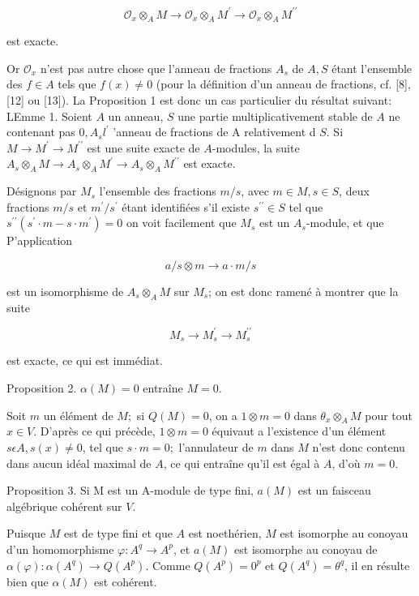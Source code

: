 $$
\mathcal{O}_{x} \otimes_{A} M \rightarrow \mathcal{O}_{x} \otimes_{A} M^{\prime} \rightarrow \mathcal{O}_{x} \otimes_{A} M^{\prime \prime}
$$

est exacte.

Or $\mathcal{O}_{x}$ n'est pas autre chose que l'anneau de fractions $A_{s}$ de $A, S$ étant l'ensemble des $f \in A$ tels que $f(x) \neq 0$ (pour la définition d'un anneau de fractions, cf. [8], [12] ou [13]). La Proposition 1 est donc un cas particulier du résultat suivant: LEmme 1. Soient $A$ un anneau, $S$ une partie multiplicativement stable de $A$ ne contenant pas $0, A_{s} l^{\prime}$ 'anneau de fractions de A relativement d $S .$ Si $M \rightarrow M^{\prime} \rightarrow M^{\prime \prime}$ est une suite exacte de $A$-modules, la suite $A_{s} \otimes_{A} M \rightarrow A_{s} \otimes_{A} M^{\prime} \rightarrow A_{s} \otimes_{A} M^{\prime \prime}$ est exacte.

Désignons par $M_{s}$ l'ensemble des fractions $m / s$, avec $m \in M, s \in S$, deux fractions $m / s$ et $m^{\prime} / s^{\prime}$ étant identifiées s'il existe $s^{\prime \prime} \in S$ tel que $s^{\prime \prime}\left(s^{\prime} \cdot m-s \cdot m^{\prime}\right)=0$ on voit facilement que $M_{s}$ est un $A_{s}$-module, et que P'application

$$
a / s \otimes m \rightarrow a \cdot m / s
$$

est un isomorphisme de $A_{s} \otimes_{A} M$ sur $M_{s}$; on est donc ramené à montrer que la suite

$$
M_{s} \rightarrow M_{s}^{\prime} \rightarrow M_{s}^{\prime \prime}
$$

est exacte, ce qui est immédiat.

Proposition 2. $\alpha(M)=0$ entraîne $M=0$.

Soit $m$ un élément de $M ;$ si $Q(M)=0$, on a $1 \otimes m=0$ dans $\theta_{x} \otimes_{A} M$ pour tout $x \in V .$ D'après ce qui précède, $1 \otimes m=0$ équivaut a l'existence d'un élément $s \epsilon A, s(x) \neq 0$, tel que $s \cdot m=0 ;$ l'annulateur de $m$ dans $M$ n'est donc contenu dans aucun idéal maximal de $A$, ce qui entraîne qu'il est égal à $A$, d'où $m=0$.

Proposition 3. Si M est un A-module de type fini, $a(M)$ est un faisceau algébrique cohérent sur $V$.

Puisque $M$ est de type fini et que $A$ est noethérien, $M$ est isomorphe au conoyau d'un homomorphisme $\varphi: A^{q} \rightarrow A^{p}$, et $a(M)$ est isomorphe au conoyau de $\alpha(\varphi): \alpha\left(A^{q}\right) \rightarrow Q\left(A^{p}\right) .$ Comme $Q\left(A^{p}\right)=0^{p}$ et $Q\left(A^{q}\right)=\theta^{q}$, il en résulte bien que $\alpha(M)$ est cohérent.

